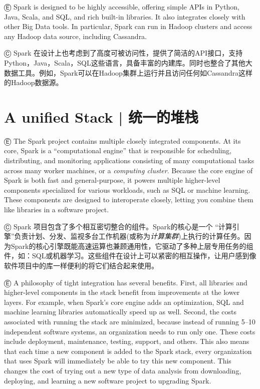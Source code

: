 Ⓔ \textcolor{etc}{Spark is designed to be highly accessible, offering simple APIs in Python, Java, Scala, and SQL, and rich built-in libraries. It also integrates closely with other Big Data tools. In particular, Spark can run in Hadoop clusters and access any Hadoop data source, including Cassandra.}

Ⓒ Spark 在设计上也考虑到了高度可被访问性，提供了简洁的API接口，支持Python，Java，Scala，SQL这些语言，具备丰富的内建库。同时也整合了其他大数据工具。例如，Spark可以在Hadoop集群上运行并且访问任何如Cassandra这样的Hadoop数据源。


\section{A unified Stack  |  统一的堆栈}\label{ux7edfux4e00ux7684ux5806ux6808-a-unified-stack}

Ⓔ \textcolor{etc}{The Spark project contains multiple closely integrated components. At its core, Spark is a “computational engine” that is responsible for scheduling, distributing, and monitoring applications consisting of many computational tasks across many worker machines, or a \emph{computing cluster}. Because the core engine of Spark is both fast and general-purpose, it powers multiple higher-level components specialized for various workloads, such as SQL or machine learning. These components are designed to interoperate closely, letting you combine them like libraries in a software project.}

Ⓒ Spark 项目包含了多个相互密切整合的组件。Spark的核心是一个 “计算引擎”负责计划、分发、监视多台工作机器(或称为\emph{计算集群})上执行的计算任务。因为Spark的核心引擎既能高速运算也兼顾通用性，它驱动了多种上层专用任务的组件，如：SQL或机器学习。这些组件在设计上可以紧密的相互操作，让用户感到像软件项目中的库一样便利的将它们结合起来使用。

Ⓔ \textcolor{etc}{A philosophy of tight integration has several benefits. First, all libraries and higher-level components in the stack benefit from improvements at the lower layers. For example, when Spark's core engine adds an optimization, SQL and machine learning libraries automatically speed up as well. Second, the costs associated with running the stack are minimized, because instead of running 5--10 independent software systems, an organization needs to run only one. These costs include deployment, maintenance, testing, support, and others. This also means that each time a new component is added to the Spark stack, every organization that uses Spark will immediately be able to try this new component. This changes the cost of trying out a new type of data analysis from downloading, deploying, and learning a new software project to upgrading Spark.}

